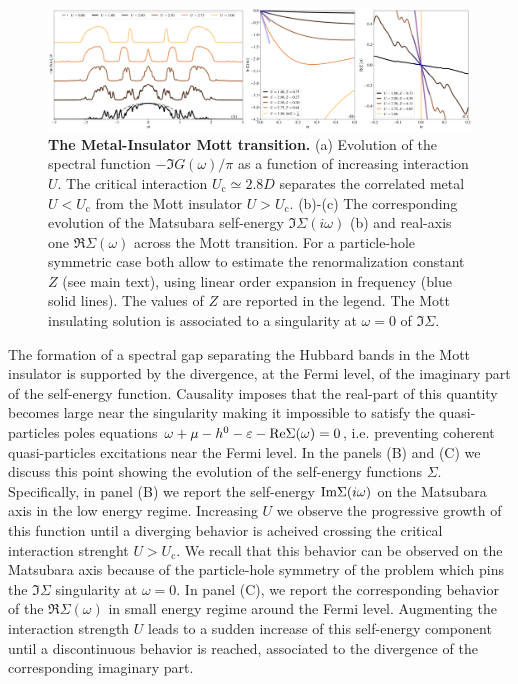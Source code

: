 \documentclass[edipack2.tex]{subfiles}
\begin{document}
\begin{figure}[t!]
  \includegraphics[width=\linewidth]{figures/figBethe.pdf}
    \caption{\label{figEx1}%
      \textbf{The Metal-Insulator Mott transition.}
      (a) Evolution of the spectral function $-\Im{G}(\omega)/\pi$ as
      a function of increasing interaction $U$. The critical
      interaction $U_\mathrm{c}\simeq 2.8D$ separates the correlated metal $U<U_\mathrm{c}$ from
      the Mott insulator $U>U_\mathrm{c}$.
      (b)-(c) The corresponding evolution of the Matsubara self-energy
      $\Im\Sigma(i\omega)$ (b) and
      real-axis one $\Re\Sigma(\omega)$ across the Mott
      transition. For a particle-hole symmetric case both allow to
      estimate the renormalization constant $Z$ (see main text), using
      linear order expansion in frequency (blue solid lines). The
      values of $Z$ are reported in the legend.
      The Mott insulating solution is associated to a singularity at
      $\omega=0$ of $\Im\Sigma$. 
        }
\end{figure}

The formation of a spectral gap separating the Hubbard bands in the
Mott insulator is supported by the divergence, at the Fermi level, of the imaginary part of
the self-energy function. Causality imposes that the real-part of
this quantity becomes large near the singularity making it impossible
to satisfy the quasi-particles poles equations
$\omega+\mu-h^0-\varepsilon-{\rm Re}{\Sigma}(\omega)=0$, i.e. preventing coherent
quasi-particles excitations near the Fermi level. 
In the panels (B) and (C) we discuss this point  showing the evolution
of the self-energy functions $\Sigma$.
Specifically, in panel (B) we report the self-energy ${\rm Im}\Sigma(i\omega)$
on the Matsubara axis in the low energy regime. Increasing $U$
we observe the progressive growth of this function until a
diverging behavior is acheived crossing the critical interaction
strenght $U>U_\mathrm{c}$.
We recall that this behavior can be observed on the Matsubara axis
because of the particle-hole symmetry of the problem which pins the
$\Im{\Sigma}$ singularity at $\omega=0$.
In panel (C), we report the corresponding behavior of the
$\Re{\Sigma}(\omega)$ in small energy regime around the Fermi
level. Augmenting the interaction strength $U$ leads to a sudden
increase of this self-energy component until a discontinuous behavior
is reached, associated to the divergence of the corresponding
imaginary part.   
\end{document}

